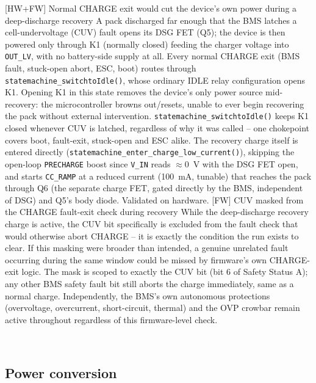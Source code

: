 \begin{FMEATable}
    \FMEAItemModerate
        {[HW+FW] Normal CHARGE exit would cut the device's own power during a deep-discharge recovery}
        {A pack discharged far enough that the \ac{BMS} latches a cell-undervoltage (CUV) fault opens its DSG \ac{FET} (Q5); the device is then powered only through K1 (normally closed) feeding the charger voltage into \texttt{OUT\_LV}, with no battery-side supply at all. Every normal CHARGE exit (BMS fault, stuck-open abort, \ac{ESC}, boot) routes through \texttt{statemachine\_switchtoIdle()}, whose ordinary IDLE relay configuration opens K1.}
        {Opening K1 in this state removes the device's only power source mid-recovery: the microcontroller browns out/resets, unable to ever begin recovering the pack without external intervention.}
        {\texttt{statemachine\_switchtoIdle()} keeps K1 closed whenever CUV is latched, regardless of why it was called -- one chokepoint covers boot, fault-exit, stuck-open and \ac{ESC} alike. The recovery charge itself is entered directly (\texttt{statemachine\_enter\_charge\_low\_current()}), skipping the open-loop \texttt{PRECHARGE} boost since \texttt{V\_IN} reads $\approx$\qty{0}{\volt} with the DSG \ac{FET} open, and starts \texttt{CC\_RAMP} at a reduced current (\qty{100}{\milli\ampere}, tunable) that reaches the pack through Q6 (the separate charge \ac{FET}, gated directly by the \ac{BMS}, independent of DSG) and Q5's body diode. Validated on hardware.}
    \FMEAItemMinor
        {[FW] CUV masked from the CHARGE fault-exit check during recovery}
        {While the deep-discharge recovery charge is active, the CUV bit specifically is excluded from the fault check that would otherwise abort CHARGE -- it is exactly the condition the run exists to clear.}
        {If this masking were broader than intended, a genuine unrelated fault occurring during the same window could be missed by firmware's own CHARGE-exit logic.}
        {The mask is scoped to exactly the CUV bit (bit 6 of Safety Status A); any other \ac{BMS} safety fault bit still aborts the charge immediately, same as a normal charge. Independently, the \ac{BMS}'s own autonomous protections (overvoltage, overcurrent, short-circuit, thermal) and the \ac{OVP} crowbar remain active throughout regardless of this firmware-level check.}
    \caption{FMEA -- Charging} \\
    \end{FMEATable}

\FloatBarrier

\subsection{Power conversion}

